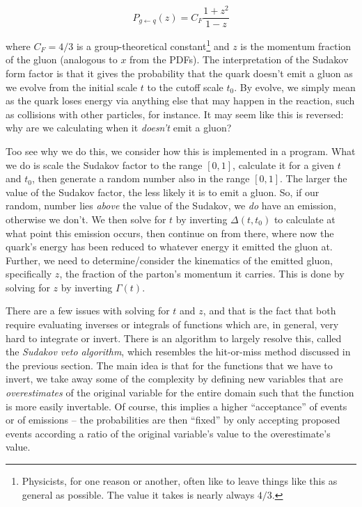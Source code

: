 \begin{equation}
  P_{g \leftarrow q}(z) = C_F \frac{1 + z^2}{1 - z}\label{eq:2-theory-splittingfn}
\end{equation}

where $C_F=4/3$ is a group-theoretical constant\footnote{Physicists, for one reason or another, often like to leave things like this as general as possible. The value it takes is nearly always $4/3$.} and $z$ is the momentum fraction of the gluon (analogous to $x$ from the PDFs). The interpretation of the Sudakov form factor is that it gives the probability that the quark doesn't emit a gluon as we evolve from the initial scale $t$ to the cutoff scale $t_0$. By evolve, we simply mean as the quark loses energy via anything else that may happen in the reaction, such as collisions with other particles, for instance. It may seem like this is reversed: why are we calculating when it \textit{doesn't} emit a gluon?

Too see why we do this, we consider how this is implemented in a program. What we do is scale the Sudakov factor to the range $[0,1]$, calculate it for a given $t$ and $t_0$, then generate a random number also in the range $[0,1]$. The larger the value of the Sudakov factor, the less likely it is to emit a gluon. So, if our random, number lies \textit{above} the value of the Sudakov, we \textit{do} have an emission, otherwise we don't. We then solve for $t$ by inverting $\Delta(t,t_0)$ to calculate at what point this emission occurs, then continue on from there, where now the quark's energy has been reduced to whatever energy it emitted the gluon at. Further, we need to determine/consider the kinematics of the emitted gluon, specifically $z$, the fraction of the parton's momentum it carries. This is done by solving for $z$ by inverting $\Gamma(t)$.

There are a few issues with solving for $t$ and $z$, and that is the fact that both require evaluating inverses or integrals of functions which are, in general, very hard to integrate or invert. There is an algorithm to largely resolve this, called the \textit{Sudakov veto algorithm}, which resembles the hit-or-miss method discussed in the previous section. The main idea is that for the functions that we have to invert, we take away some of the complexity by defining new variables that are \textit{overestimates} of the original variable for the entire domain such that the function is more easily invertable. Of course, this implies a higher ``acceptance'' of events or of emissions -- the probabilities are then ``fixed'' by only accepting proposed events according a ratio of the original variable's value to the overestimate's value.


